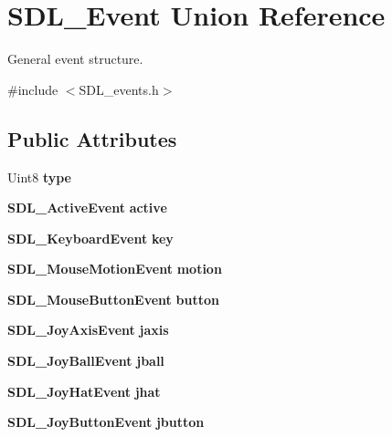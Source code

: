 \section{S\+D\+L\+\_\+\+Event Union Reference}
\label{union_s_d_l___event}


General event structure.  




{\ttfamily \#include $<$S\+D\+L\+\_\+events.\+h$>$}

\subsection*{Public Attributes}
\begin{DoxyCompactItemize}
\item 
Uint8 {\bfseries type}\label{union_s_d_l___event_a166d8d0350220f28bef35a7b4a8c6900}

\item 
{\bf S\+D\+L\+\_\+\+Active\+Event} {\bfseries active}\label{union_s_d_l___event_ab8b2b899275fb4116ec85ae5a926b23d}

\item 
{\bf S\+D\+L\+\_\+\+Keyboard\+Event} {\bfseries key}\label{union_s_d_l___event_ab99927835cc77a9b6bb50b419b4a27df}

\item 
{\bf S\+D\+L\+\_\+\+Mouse\+Motion\+Event} {\bfseries motion}\label{union_s_d_l___event_ac3c89e190faacbe84280cd539453bab6}

\item 
{\bf S\+D\+L\+\_\+\+Mouse\+Button\+Event} {\bfseries button}\label{union_s_d_l___event_ab6da2fa2687e5f849f270adecc64785f}

\item 
{\bf S\+D\+L\+\_\+\+Joy\+Axis\+Event} {\bfseries jaxis}\label{union_s_d_l___event_ac4611acd0e9c675e67dc20919f0accb4}

\item 
{\bf S\+D\+L\+\_\+\+Joy\+Ball\+Event} {\bfseries jball}\label{union_s_d_l___event_ae433f511e3383d17f8fe02df745ee8f8}

\item 
{\bf S\+D\+L\+\_\+\+Joy\+Hat\+Event} {\bfseries jhat}\label{union_s_d_l___event_a421b40e0f8e01f181c8d5548cff1dd1d}

\item 
{\bf S\+D\+L\+\_\+\+Joy\+Button\+Event} {\bfseries jbutton}\label{union_s_d_l___event_a591104d64903ae1cf70874fb5d3124ff}


\end{DoxyCompactItemize}
